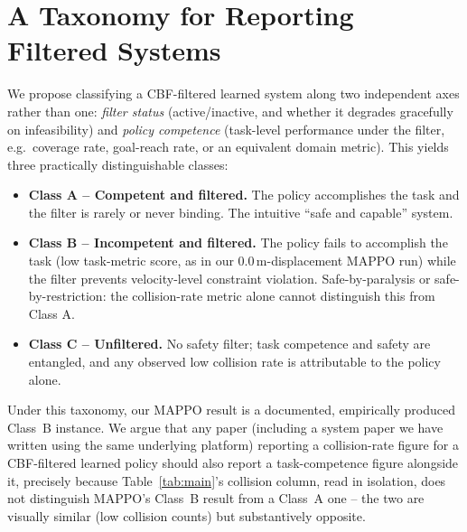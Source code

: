 \documentclass[12pt]{article}
\newcommand{\si}[1]{\mathrm{#1}}
\begin{document}
\section{A Taxonomy for Reporting Filtered Systems}
We propose classifying a CBF-filtered learned system along two independent
axes rather than one: \emph{filter status} (active/inactive, and whether it
degrades gracefully on infeasibility) and \emph{policy competence}
(task-level performance under the filter, e.g.\ coverage rate, goal-reach
rate, or an equivalent domain metric). This yields three practically
distinguishable classes:

\begin{itemize}
  \item \textbf{Class A -- Competent and filtered.} The policy accomplishes
        the task and the filter is rarely or never binding. The intuitive
        ``safe and capable'' system.
  \item \textbf{Class B -- Incompetent and filtered.} The policy fails to
        accomplish the task (low task-metric score, as in our
        $0.0\,\si{m}$-displacement MAPPO run) while the filter prevents
        velocity-level constraint violation. Safe-by-paralysis or
        safe-by-restriction: the collision-rate metric alone cannot
        distinguish this from Class A.
  \item \textbf{Class C -- Unfiltered.} No safety filter; task competence and
        safety are entangled, and any observed low collision rate is
        attributable to the policy alone.
\end{itemize}

Under this taxonomy, our MAPPO result is a documented, empirically produced
Class~B instance. We argue that any paper (including a system paper we have
written using the same underlying platform) reporting a collision-rate
figure for a CBF-filtered learned policy should also report a task-competence
figure alongside it, precisely because Table~\ref{tab:main}'s collision
column, read in isolation, does not distinguish MAPPO's Class~B result from
a Class~A one -- the two are visually similar (low collision counts) but
substantively opposite.
\end{document}
